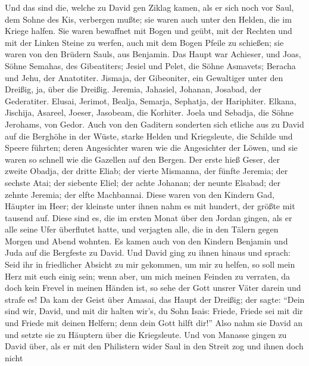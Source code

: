  Und das sind die, welche zu David gen Ziklag kamen, als
er sich noch vor Saul, dem Sohne des Kis, verbergen mußte; sie waren
auch unter den Helden, die im Kriege halfen.  Sie waren
bewaffnet mit Bogen und geübt, mit der Rechten und mit der Linken Steine
zu werfen, auch mit dem Bogen Pfeile zu schießen; sie waren von den
Brüdern Sauls, aus Benjamin.  Das Haupt war Achieser, und
Joas, Söhne Semahas, des Gibeatiters; Jesiel und Pelet, die Söhne
Asmavets; Beracha und Jehu, der Anatotiter.  Jismaja, der
Gibeoniter, ein Gewaltiger unter den Dreißig, ja, über die Dreißig.
Jeremia, Jahasiel, Johanan, Josabad, der Gederatiter. 
Elusai, Jerimot, Bealja, Semarja, Sephatja, der Hariphiter.
 Elkana, Jischija, Asareel, Joeser, Jasobeam, die
Korhiter.  Joela und Sebadja, die Söhne Jerohams, von
Gedor.  Auch von den Gaditern sonderten sich etliche aus
zu David auf die Berghöhe in der Wüste, starke Helden und Kriegsleute,
die Schilde und Speere führten; deren Angesichter waren wie die
Angesichter der Löwen, und sie waren so schnell wie die Gazellen auf den
Bergen.  Der erste hieß Geser, der zweite Obadja, der
dritte Eliab;  der vierte Mismanna, der fünfte Jeremia;
 der sechste Atai; der siebente Eliel; 
der achte Johanan; der neunte Elsabad;  der zehnte
Jeremia; der elfte Machbannai.  Diese waren von den
Kindern Gad, Häupter im Heer; der kleinste unter ihnen nahm es mit
hundert, der größte mit tausend auf.  Diese sind es, die
im ersten Monat über den Jordan gingen, als er alle seine Ufer
überflutet hatte, und verjagten alle, die in den Tälern gegen Morgen und
Abend wohnten.  Es kamen auch von den Kindern Benjamin
und Juda auf die Bergfeste zu David.  Und David ging zu
ihnen hinaus und sprach: Seid ihr in friedlicher Absicht zu mir
gekommen, um mir zu helfen, so soll mein Herz mit euch einig sein; wenn
aber, um mich meinen Feinden zu verraten, da doch kein Frevel in meinen
Händen ist, so sehe der Gott unsrer Väter darein und strafe es!
 Da kam der Geist über Amasai, das Haupt der Dreißig; der
sagte: ``Dein sind wir, David, und mit dir halten wir's, du Sohn Isais:
Friede, Friede sei mit dir und Friede mit deinen Helfern; denn dein Gott
hilft dir!'' Also nahm sie David an und setzte sie zu Häuptern über die
Kriegsleute.  Und von Manasse gingen zu David über, als
er mit den Philistern wider Saul in den Streit zog und ihnen doch nicht
